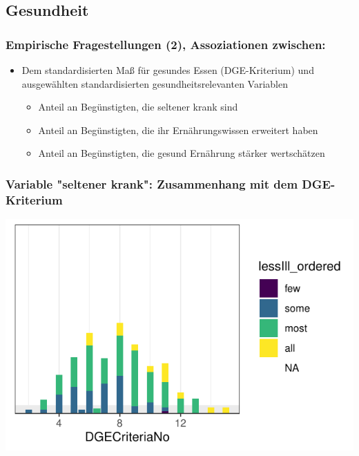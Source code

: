 \subsection{Gesundheit}

\begin{frame}[fragile]
\frametitle{Empirische Fragestellungen (2), Assoziationen zwischen:}
\begin{itemize}
\item Dem standardisierten Maß für gesundes Essen (DGE-Kriterium) und ausgewählten standardisierten gesundheitsrelevanten Variablen 
\begin{itemize}
\item Anteil an Begünstigten, die seltener krank sind 
\item Anteil an Begünstigten, die ihr Ernährungswissen erweitert haben 
\item Anteil an Begünstigten, die gesund Ernährung stärker wertschätzen
\end{itemize}
\end{itemize}
\end{frame}

\begin{frame}[fragile]
\frametitle{Variable "seltener krank": Zusammenhang mit dem DGE-Kriterium}
\begin{knitrout}\footnotesize
{}\color{fgcolor}\begin{kframe}


{\ttfamily\noindent\color{warningcolor}{\#\# Warning: Removed 244 rows containing missing values (position\_stack).}}\end{kframe}

{\centering \includegraphics[width=\maxwidth]{figure/beamer-lessIllDGEplot-1} 

}



\end{knitrout}
\end{frame} 

